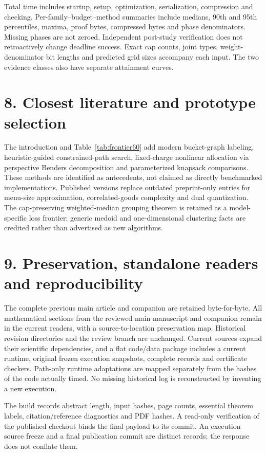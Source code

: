 \documentclass[11pt,letterpaper]{article}
\theoremstyle{definition}\newtheorem{remark}[theorem]{Remark}
\begin{document}
Total time includes startup, setup, optimization, serialization, compression and checking. Per-family--budget--method summaries include medians, 90th and 95th percentiles, maxima, proof bytes, compressed bytes and phase denominators. Missing phases are not zeroed. Independent post-study verification does not retroactively change deadline success. Exact cap counts, joint types, weight-denominator bit lengths and predicted grid sizes accompany each input. The two evidence classes also have separate attainment curves.

\section*{8. Closest literature and prototype selection}
The introduction and Table~\ref{tab:frontier60} add modern bucket-graph labeling, heuristic-guided constrained-path search, fixed-charge nonlinear allocation via perspective Benders decomposition and parameterized knapsack comparisons. These methods are identified as antecedents, not claimed as directly benchmarked implementations. Published versions replace outdated preprint-only entries for menu-size approximation, correlated-goods complexity and dual quantization. The cap-preserving weighted-median grouping theorem is retained as a model-specific loss frontier; generic medoid and one-dimensional clustering facts are credited rather than advertised as new algorithms.

\section*{9. Preservation, standalone readers and reproducibility}
The complete previous main article and companion are retained byte-for-byte. All mathematical sections from the reviewed main manuscript and companion remain in the current readers, with a source-to-location preservation map. Historical revision directories and the review branch are unchanged. Current sources expand their scientific dependencies, and a flat code/data package includes a current runtime, original frozen execution snapshots, complete records and certificate checkers. Path-only runtime adaptations are mapped separately from the hashes of the code actually timed. No missing historical log is reconstructed by inventing a new execution.

The build records abstract length, input hashes, page counts, essential theorem labels, citation/reference diagnostics and PDF hashes. A read-only verification of the published checkout binds the final payload to its commit. An execution source freeze and a final publication commit are distinct records; the response does not conflate them.
\end{document}
